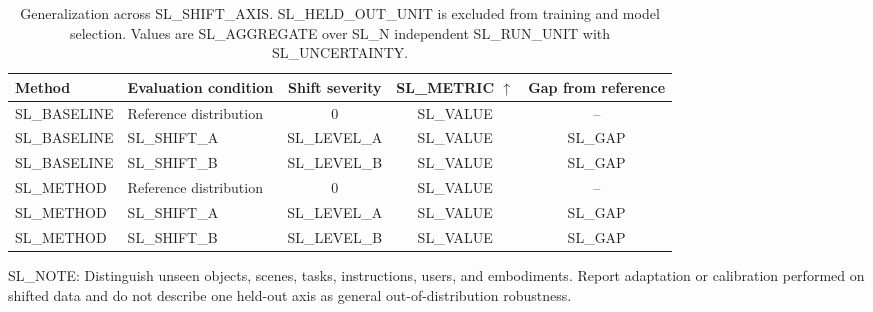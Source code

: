\begin{table}[t]
  \centering
  \small
  \caption{Generalization across SL_SHIFT_AXIS. SL_HELD_OUT_UNIT is excluded
  from training and model selection. Values are SL_AGGREGATE over SL_N
  independent SL_RUN_UNIT with SL_UNCERTAINTY.}
  \label{tab:SL_LABEL}
  \begin{tabular}{llccc}
    \toprule
    Method & Evaluation condition & Shift severity & SL_METRIC $\uparrow$ &
    Gap from reference \\
    \midrule
    SL_BASELINE & Reference distribution & 0 & SL_VALUE & -- \\
    SL_BASELINE & SL_SHIFT_A & SL_LEVEL_A & SL_VALUE & SL_GAP \\
    SL_BASELINE & SL_SHIFT_B & SL_LEVEL_B & SL_VALUE & SL_GAP \\
    \midrule
    SL_METHOD & Reference distribution & 0 & SL_VALUE & -- \\
    SL_METHOD & SL_SHIFT_A & SL_LEVEL_A & SL_VALUE & SL_GAP \\
    SL_METHOD & SL_SHIFT_B & SL_LEVEL_B & SL_VALUE & SL_GAP \\
    \bottomrule
  \end{tabular}
  \vspace{2pt}

  \parbox{0.98\linewidth}{\footnotesize
  SL_NOTE: Distinguish unseen objects, scenes, tasks, instructions, users, and
  embodiments. Report adaptation or calibration performed on shifted data and
  do not describe one held-out axis as general out-of-distribution robustness.}
\end{table}
